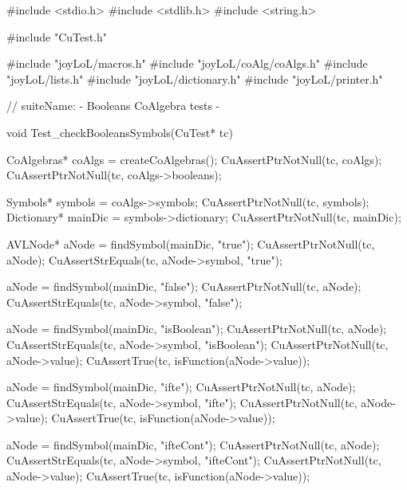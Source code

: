 \starttyping
#include <stdio.h>
#include <stdlib.h>
#include <string.h>

#include "CuTest.h"

#include "joyLoL/macros.h"
#include "joyLoL/coAlg/coAlgs.h"
#include "joyLoL/lists.h"
#include "joyLoL/dictionary.h"
#include "joyLoL/printer.h"

// suiteName: - Booleans CoAlgebra tests -

void Test_checkBooleansSymbols(CuTest* tc) {
  CoAlgebras* coAlgs = createCoAlgebras();
  CuAssertPtrNotNull(tc, coAlgs);
  CuAssertPtrNotNull(tc, coAlgs->booleans);

  Symbols* symbols = coAlgs->symbols;
  CuAssertPtrNotNull(tc, symbols);
  Dictionary* mainDic = symbols->dictionary;
  CuAssertPtrNotNull(tc, mainDic);

  AVLNode* aNode = findSymbol(mainDic, "true");
  CuAssertPtrNotNull(tc, aNode);
  CuAssertStrEquals(tc, aNode->symbol, "true");

  aNode = findSymbol(mainDic, "false");
  CuAssertPtrNotNull(tc, aNode);
  CuAssertStrEquals(tc, aNode->symbol, "false");

  aNode = findSymbol(mainDic, "isBoolean");
  CuAssertPtrNotNull(tc, aNode);
  CuAssertStrEquals(tc, aNode->symbol, "isBoolean");
  CuAssertPtrNotNull(tc, aNode->value);
  CuAssertTrue(tc, isFunction(aNode->value));

  aNode = findSymbol(mainDic, "ifte");
  CuAssertPtrNotNull(tc, aNode);
  CuAssertStrEquals(tc, aNode->symbol, "ifte");
  CuAssertPtrNotNull(tc, aNode->value);
  CuAssertTrue(tc, isFunction(aNode->value));

  aNode = findSymbol(mainDic, "ifteCont");
  CuAssertPtrNotNull(tc, aNode);
  CuAssertStrEquals(tc, aNode->symbol, "ifteCont");
  CuAssertPtrNotNull(tc, aNode->value);
  CuAssertTrue(tc, isFunction(aNode->value));
}

\stoptyping

\stopJoyLoLWord